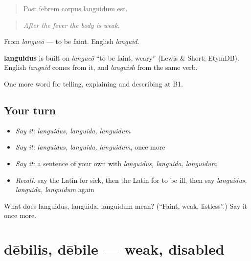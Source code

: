 \begin{quote}
Post febrem corpus languidum est.
\end{quote}

\begin{quote}
\emph{After the fever the body is weak.}
\end{quote}

From \emph{langueō} — to be faint. English \emph{languid}.

\begin{cousinweb}
\textbf{languidus} is built on \emph{langueō} \textquotedblleft{}to be faint, weary\textquotedblright{} (Lewis \& Short; EtymDB). English \emph{languid} comes from it, and \emph{languish} from the same verb.
\end{cousinweb}

\begin{grammarlens}[title={What you've built}]
One more word for telling, explaining and describing at B1.
\end{grammarlens}

\subsection*{Your turn}
\begin{itemize}
\raggedright
  \item \emph{Say it:} \emph{languidus, languida, languidum}
  \item \emph{Say it:} \emph{languidus, languida, languidum}, once more
  \item \emph{Say it:} a sentence of your own with \emph{languidus, languida, languidum}
  \item \emph{Recall:} say the Latin for sick, then the Latin for to be ill, then say \emph{languidus, languida, languidum} again
\end{itemize}

\begin{tcolorbox}[breakable,colback=teal!4,colframe=teal!35!black,title={Before you move on}]
What does languidus, languida, languidum mean? (\textquotedblleft{}Faint, weak, listless\textquotedblright{}.) Say it once more.
\end{tcolorbox}
\section[dēbilis, dēbile]{dēbilis, dēbile — weak, disabled}

\label{lesson:LA-C521-debilis}



